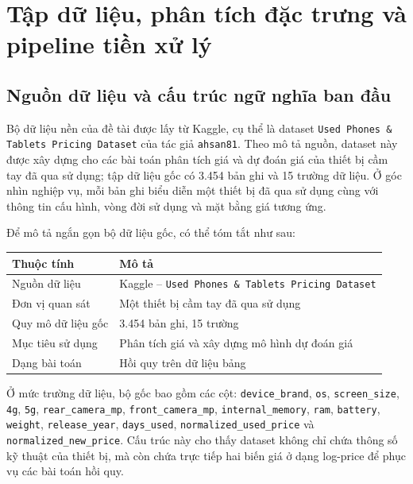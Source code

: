 \section{Tập dữ liệu, phân tích đặc trưng và pipeline tiền xử lý}

\subsection{Nguồn dữ liệu và cấu trúc ngữ nghĩa ban đầu}

Bộ dữ liệu nền của đề tài được lấy từ Kaggle, cụ thể là dataset \texttt{Used Phones \& Tablets Pricing Dataset} của tác giả \texttt{ahsan81}. Theo mô tả nguồn, dataset này được xây dựng cho các bài toán phân tích giá và dự đoán giá của thiết bị cầm tay đã qua sử dụng; tập dữ liệu gốc có 3.454 bản ghi và 15 trường dữ liệu. Ở góc nhìn nghiệp vụ, mỗi bản ghi biểu diễn một thiết bị đã qua sử dụng cùng với thông tin cấu hình, vòng đời sử dụng và mặt bằng giá tương ứng.

Để mô tả ngắn gọn bộ dữ liệu gốc, có thể tóm tắt như sau:

\begin{center}
\begin{tabular}{|l|l|}
\hline
\textbf{Thuộc tính} & \textbf{Mô tả} \\
\hline
Nguồn dữ liệu & Kaggle -- \texttt{Used Phones \& Tablets Pricing Dataset} \\
\hline
Đơn vị quan sát & Một thiết bị cầm tay đã qua sử dụng \\
\hline
Quy mô dữ liệu gốc & 3.454 bản ghi, 15 trường \\
\hline
Mục tiêu sử dụng & Phân tích giá và xây dựng mô hình dự đoán giá \\
\hline
Dạng bài toán & Hồi quy trên dữ liệu bảng \\
\hline
\end{tabular}
\end{center}

Ở mức trường dữ liệu, bộ gốc bao gồm các cột: \texttt{device\_brand}, \texttt{os}, \texttt{screen\_size}, \texttt{4g}, \texttt{5g}, \texttt{rear\_camera\_mp}, \texttt{front\_camera\_mp}, \texttt{internal\_memory}, \texttt{ram}, \texttt{battery}, \texttt{weight}, \texttt{release\_year}, \texttt{days\_used}, \texttt{normalized\_used\_price} và \texttt{normalized\_new\_price}. Cấu trúc này cho thấy dataset không chỉ chứa thông số kỹ thuật của thiết bị, mà còn chứa trực tiếp hai biến giá ở dạng log-price để phục vụ các bài toán hồi quy.

